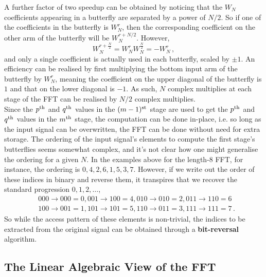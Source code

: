 A further factor of two speedup can be obtained by noticing that the $W_N$
coefficients appearing in a butterfly are separated by a power of $N/2$. So
if one of the coefficients in the butterfly is $W_N^r$, then the corresponding
coefficient on the other arm of the butterfly will be $W_N^{r + N/2}$.
However,
%
\begin{displaymath}
  W_N^{r + \frac{N}{2}} = W_N^r W_N^{\frac{N}{2}} = - W_N^r \,,
\end{displaymath}
%
and only a single coefficient is actually used in each butterfly, scaled by
$\pm 1$. An efficiency can be realised by first multiplying the bottom input arm
of the butterfly by $W_N^r$, meaning the coefficient on the upper diagonal of
the butterfly is $1$ and that on the lower diagonal is $-1$. As such, $N$
complex multiplies at each stage of the FFT can be realised by $N/2$ complex
multiplies.\\

Since the $p^\mathrm{th}\mkern1mu$ and $q^\mathrm{th}\mkern1mu$ values in the $(m-1)^\mathrm{st}\mkern1mu$ stage are used to get the
$p^\mathrm{th}\mkern1mu$ and $q^\mathrm{th}\mkern1mu$ values in the $m^\mathrm{th}\mkern1mu$ stage, the computation can be done
in-place, i.e. so long as the input signal can be overwritten, the FFT can
be done without need for extra storage. The ordering of the input signal's
elements to compute the first stage's butterflies seems somewhat complex,
and it's not clear how one might generalise the ordering for a given $N$.
In the examples above for the length-8 FFT, for instance, the ordering is
$0,4,2,6,1,5,3,7$. However, if we write out the order of these indices
in binary and reverse them, it transpires that we recover the standard
progression $0,1,2,\hdots$,
%
\begin{align*}
  &000 \rightarrow 000 = 0, 001 \rightarrow 100 = 4, 010 \rightarrow 010 = 2,
  011 \rightarrow 110 = 6 \\
  &100 \rightarrow 001 = 1, 101 \rightarrow 101 = 5, 110 \rightarrow 011 = 3,
  111 \rightarrow 111 = 7 \,.
\end{align*}
%
So while the access pattern of these elements is non-trivial, the indices
to be extracted from the original signal can be obtained through a
\textbf{bit-reversal} algorithm.

\subsection{The Linear Algebraic View of the FFT}

